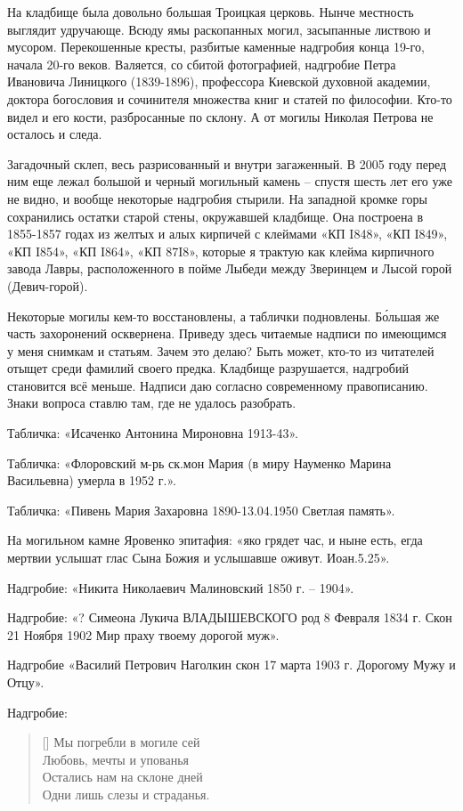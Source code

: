 На кладбище была довольно большая Троицкая церковь. Нынче местность выглядит удручающе. Всюду ямы раскопанных могил, засыпанные листвою и мусором. Перекошенные кресты, разбитые каменные надгробия конца 19-го, начала 20-го веков. Валяется, со сбитой фотографией, надгробие Петра Ивановича Линицкого (1839-1896), профессора Киевской духовной академии, доктора богословия и сочинителя множества книг и статей по философии. Кто-то видел и его кости, разбросанные по склону. А от могилы Николая Петрова не осталось и следа.

Загадочный склеп, весь разрисованный и внутри загаженный. В 2005 году перед ним еще лежал большой и черный могильный камень – спустя шесть лет его уже не видно, и вообще некоторые надгробия стырили. На западной кромке горы сохранились остатки старой стены, окружавшей кладбище. Она построена в 1855-1857 годах из желтых и алых кирпичей с клеймами «КП I848», «КП I849», «КП I854», «КП I864», «КП 87I8», которые я трактую как клейма кирпичного завода Лавры, расположенного в пойме Лыбеди между Зверинцем и Лысой горой (Девич-горой).  

Некоторые могилы кем-то восстановлены, а таблички подновлены. Б\'ольшая же часть захоронений осквернена. Приведу здесь читаемые надписи по имеющимся у меня снимкам и статьям. Зачем это делаю? Быть может, кто-то из читателей отыщет среди фамилий своего предка. Кладбище разрушается, надгробий становится всё меньше. Надписи даю согласно современному правописанию. Знаки вопроса ставлю там, где не удалось разобрать.

Табличка: «Исаченко Антонина Мироновна 1913-43».

Табличка: «Флоровский м-рь ск.мон Мария (в миру Науменко Марина Васильевна) умерла в 1952 г.».

Табличка: «Пивень Мария Захаровна 1890-13.04.1950 Светлая память».

На могильном камне Яровенко эпитафия: «яко грядет час, и ныне есть, егда мертвии услышат глас Сына Божия и услышавше оживут. Иоан.5.25».

Надгробие: «Никита Николаевич Малиновский 1850 г. – 1904».

Надгробие: «? Симеона Лукича ВЛАДЫШЕВСКОГО род 8 Февраля 1834 г. Скон 21 Ноября 1902 Мир праху твоему дорогой муж».

Надгробие «Василий Петрович Наголкин скон 17 марта 1903 г. Дорогому Мужу и Отцу».

Надгробие:

\settowidth{\versewidth}{Остались нам на склоне дней.} 
\begin{verse}[\versewidth]
Мы погребли в могиле сей\\
Любовь, мечты и упованья\\
Остались нам на склоне дней\\
Одни лишь слезы и страданья.\\
\end{verse}

